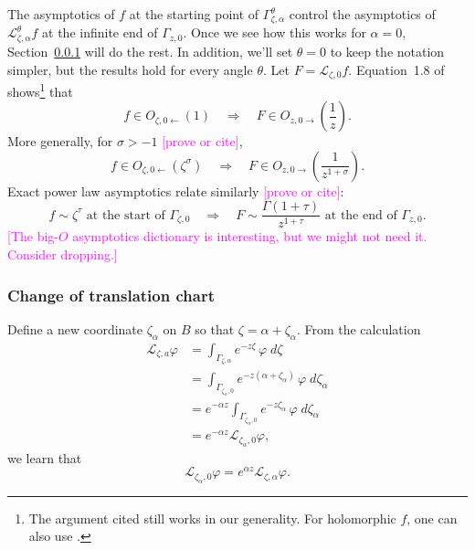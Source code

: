\documentclass{article}
\theoremstyle{definition}
\newcommand{\laplace}{\mathcal{L}}
\theoremstyle{plain}
\begin{document}
The asymptotics of $f$ at the starting point of $\Gamma_{\zeta, \alpha}^\theta$ control the asymptotics of $\laplace_{\zeta, \alpha}^\theta f$ at the infinite end of $\Gamma_{z, 0}$. Once we see how this works for $\alpha = 0$, Section~\ref{translation} will do the rest. In addition, we'll set $\theta=0$ to keep the notation simpler, but the results hold for every angle $\theta$. Let $F = \laplace_{\zeta, 0} f$. Equation~1.8 of \cite{laplace-tfm} shows\footnote{The argument cited still works in our generality. For holomorphic $f$, one can also use \cite[Equation 1.5]{sternin1995borel}.} that
\[ f \in O_{\zeta, 0 \leftarrow}(1) \quad\Longrightarrow\quad F \in O_{z, 0 \rightarrow}\left(\frac{1}{z}\right). \]
More generally, for $\sigma > -1$ \textcolor{magenta}{[prove or cite]},
\[ f \in O_{\zeta, 0 \leftarrow}(\zeta^\sigma) \quad\Longrightarrow\quad F \in O_{z, 0 \rightarrow}\left(\frac{1}{z^{1 + \sigma}}\right). \]
Exact power law asymptotics relate similarly \textcolor{magenta}{[prove or cite]}:
\[ f \sim \zeta^\tau \text{ at the start of } \Gamma_{\zeta, 0} \quad\Longrightarrow\quad F \sim \frac{\Gamma(1+\tau)}{z^{1+\tau}} \text{ at the end of } \Gamma_{z, 0}. \]
\textcolor{magenta}{[The big-$O$ asymptotics dictionary is interesting, but we might not need it. Consider dropping.]}

\subsubsection{Change of translation chart}\label{translation}
Define a new coordinate $\zeta_\alpha$ on $B$ so that $\zeta = \alpha + \zeta_\alpha$. From the calculation
\begin{align*}
\laplace_{\zeta, a} \varphi & = \int_{\Gamma_{\zeta, \alpha}} e^{-z \zeta}\,\varphi\;d\zeta \\
& = \int_{\Gamma_{\zeta_\alpha, 0}} e^{-z(\alpha + \zeta_\alpha)}\,\varphi\;d\zeta_\alpha \\
& = e^{-\alpha z} \int_{\Gamma_{\zeta_\alpha, 0}} e^{-z\zeta_\alpha}\,\varphi\;d\zeta_\alpha \\
& = e^{-\alpha z} \laplace_{\zeta_\alpha, 0} \varphi,
\end{align*}
we learn that
\begin{equation}
    \label{change-chart}
    \laplace_{\zeta_\alpha, 0} \varphi = e^{\alpha z} \laplace_{\zeta, \alpha} \varphi.
\end{equation}
%
\end{document}
